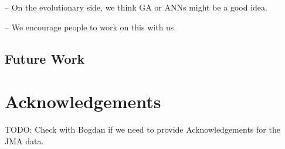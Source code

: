 \documentclass{sig-alternate}
\begin{document}
-- On the evolutionary side, we think GA or ANNs might be a good idea.

-- We encourage people to work on this with us.

\subsection{Future Work}




\section*{Acknowledgements}

TODO: Check with Bogdan if we need to provide Acknowledgements for the
JMA data.




\end{document}
